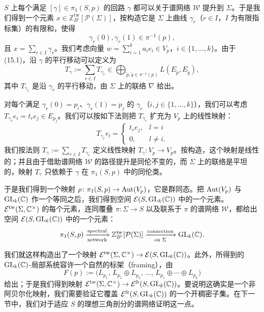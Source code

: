 $S$ 上每个满足 $[\gamma]\in\pi_1(S,p)$ 的回路 $\gamma$ 都可以关于谱网络 $\mathcal{W}$ 提升到 $\Sigma$。于是我们得到一个元素 $x\in\mathbb{Z}^{\mathrm{tw}}_{B'}[\mathcal{P}(\Sigma)]$，按构造它是 $\Sigma$ 上曲线 $\gamma_r$（$r\in I$，$I$ 为有限指标集）的有限和，使得
\begin{equation}
\gamma_r(0),\gamma_r(1)\in\pi^{-1}(p) , \tag{15.1}
\end{equation}
且 $x=\sum_{r\in I}\gamma_r$。我们考虑向量 $w=\sum_{i=1}^{k}a_ie_i\in V_p$，$i\in\{1,\dots,k\}$。由于 (15.1)，沿 $\gamma$ 的平行移动可以定义为
\[
T_\gamma:=\sum_{r\in I}T_{\gamma_r}\in\bigoplus_{\tilde p,\tilde q\in\pi^{-1}(p)}L(E_{\tilde p},E_{\tilde q}) ,
\]
其中 $T_{\gamma_r}$ 是沿 $\gamma_r$ 的平行移动，由 $\Sigma$ 上的联络 $\nabla$ 给出。

对每个满足 $\gamma_r(0)=p_i$、$\gamma_r(1)=p_j$ 的 $\gamma_r$（$i,j\in\{1,\dots,k\}$），我们可以考虑 $T_{\gamma_r}e_i=t_re_j\in E_{p_j}$。我们可以按如下法则把 $T_{\gamma_r}$ 扩充为 $V_p$ 上的线性映射：
\[
T_{\gamma_r}e_l=
\begin{cases}
t_re_j, & l=i\\
0, & l\neq i .
\end{cases}
\]
我们按法则 $T_\gamma:=\sum_{r\in I}T_{\gamma_r}$ 定义线性映射 $T_\gamma\colon V_p\to V_p$。按构造，这个映射是线性的；并且由于借助谱网络 $\mathcal{W}$ 的路径提升是同伦不变的，而 $\Sigma$ 上的联络是平坦的，映射 $T_\gamma$ 只依赖于 $\gamma$ 在 $\pi_1(S,p)$ 中的同伦类。

于是我们得到一个映射 $\rho\colon\pi_1(S,p)\to\operatorname{Aut}(V_p)$，它是群同态。把 $\operatorname{Aut}(V_p)$ 与 $\operatorname{GL}_k(\mathbb{C})$ 作一个等同之后，我们得到空间 $\mathcal{E}(S,\operatorname{GL}_k(\mathbb{C}))$ 中的一个元素。$\mathcal{E}^{\mathrm{tw}}(\Sigma,\mathbb{C}^\times)$ 的每个元素，连同覆叠 $\pi\colon\Sigma\to S$ 以及联系于 $\pi$ 的谱网络 $\mathcal{W}$，都给出空间 $\mathcal{E}(S,\operatorname{GL}_k(\mathbb{C}))$ 中的一个元素：
\[
\pi_1(S,p)\xrightarrow[\text{network}]{\text{spectral}}\mathbb{Z}^{\mathrm{tw}}_{B'}[\mathcal{P}(\Sigma)]\xrightarrow[\text{on }\Sigma]{\text{connection}}\operatorname{GL}_k(\mathbb{C}) .
\]

我们就这样构造出了一个映射 $\mathcal{E}^{\mathrm{tw}}(\Sigma,\mathbb{C}^\times)\to\mathcal{E}(S,\operatorname{GL}_k(\mathbb{C}))$。此外，所得到的 $\operatorname{GL}_k(\mathbb{C})$-局部系统容许一个自然的标架（framing），由
\[
F(p):=\big(L_{p_1},\,L_{p_1}\oplus L_{p_2},\,\dots,\,L_{p_1}\oplus\cdots\oplus L_{p_k}\big)
\]
给出；于是我们得到映射 $\mathcal{E}^{\mathrm{tw}}(\Sigma,\mathbb{C}^\times)\to\mathcal{E}^{\mathrm{fr}}(S,\operatorname{GL}_k(\mathbb{C}))$。要说明这确实是一个非阿贝尔化映射，我们需要验证它覆盖 $\mathcal{E}^{\mathrm{fr}}(S,\operatorname{GL}_k(\mathbb{C}))$ 的一个开稠密子集。在下一节中，我们对于适应 $S$ 的理想三角剖分的谱网络证明这一点。

